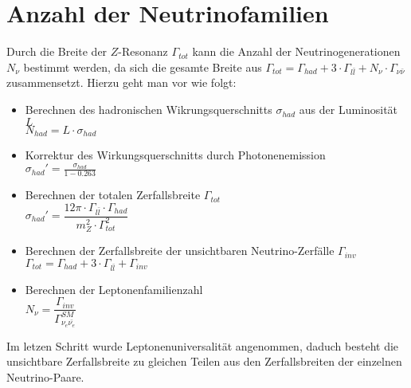 \documentclass{include/thesisclass3}
\newcommand{\cc}{\cdot}
\begin{document}
\section{Anzahl der Neutrinofamilien}
Durch die Breite der $Z$-Resonanz $\Gamma_{tot}$ kann die Anzahl der Neutrinogenerationen $N_\nu$ bestimmt werden, da sich die gesamte Breite aus $\Gamma_{tot} = \Gamma_{had} + 3 \cc \Gamma_{l \bar l} + N_\nu \cc \Gamma_{\nu \bar \nu}$ zusammensetzt. Hierzu geht man vor wie folgt:\\
\begin{itemize}
\item Berechnen des hadronischen Wikrungsquerschnitts $\sigma_{had}$ aus der Luminosität $L$\\
$N_{had}=L\cdot \sigma_{had}$

\item Korrektur des Wirkungsquerschnitts durch Photonenemission\\
$\sigma_{had}'=\frac{\sigma_{had}}{1-0.263} $

\item Berechnen der totalen Zerfallsbreite $\Gamma_{tot}$\\
$\sigma_{had}'=\dfrac{12 \pi \cdot \Gamma_{l\bar{l}}\cdot \Gamma_{had}}{m_Z^2\cdot \Gamma_{tot}^2}$
\item Berechnen der Zerfallsbreite der unsichtbaren Neutrino-Zerfälle $\Gamma_{inv}$\\
$\Gamma_{tot} = \Gamma_{had} + 3 \cc \Gamma_{l \bar l} + \Gamma_{inv}$

\item  Berechnen der Leptonenfamilienzahl\\
$N_\nu=\dfrac{\Gamma_{inv}}{\Gamma_{\nu_e\bar{\nu_e}}^{SM}}$
\end{itemize}
Im letzen Schritt wurde Leptonenuniversalität angenommen, daduch besteht die unsichtbare Zerfallsbreite zu gleichen Teilen aus den Zerfallsbreiten der einzelnen Neutrino-Paare. 
\end{document}
